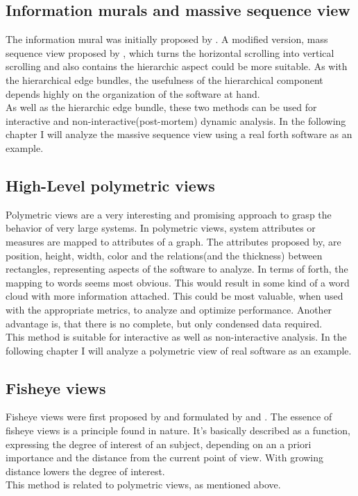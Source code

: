 \subsection*{Information murals and massive sequence view}
The information mural was initially proposed by \cite{Jerding:1998:IMT:614271.614408}. A modified version, mass sequence view proposed by \cite{Cornelissen2009}, which turns the horizontal scrolling into vertical scrolling and also contains the hierarchic aspect could be more suitable. As with the hierarchical edge bundles, the usefulness of the hierarchical component depends highly on the organization of the software at hand.
\\
As well as the hierarchic edge bundle, these two methods can be used for interactive and non-interactive(post-mortem) dynamic analysis. In the following chapter I will analyze the massive sequence view using a real forth software as an example.

\subsection*{High-Level polymetric views}
Polymetric views\cite{Ducasse:2004:HPV:977397.977739} are a very interesting and promising approach to grasp the behavior of very large systems. In polymetric views, system attributes or measures are mapped to attributes of a graph. The attributes proposed by\cite{Ducasse:2004:HPV:977397.977739}, are position, height, width, color and the relations(and the thickness) between rectangles, representing aspects of the software to analyze. In terms of forth, the mapping to words seems most obvious. This would result in some kind of a word cloud with more information attached. This could be most valuable, when used with the appropriate metrics, to analyze and optimize performance. Another advantage is, that there is no complete, but only condensed data required.
\\
This method is suitable for interactive as well as non-interactive analysis. In the following chapter I will analyze a polymetric view of real software as an example.

\subsection*{Fisheye views}
Fisheye views were first proposed by \cite{Furnas:1986:GFV:22627.22342} and formulated by \cite{Storey:1995:GLA:647547.728600} and \cite{Sarkar:1994:GFV:198366.198384}. The essence of fisheye views is a principle found in nature. It's basically described as a function, expressing the degree of interest of an subject, depending on an a priori importance and the distance from the current point of view. With growing distance lowers the degree of interest.
\\
This method is related to polymetric views, as mentioned above.

